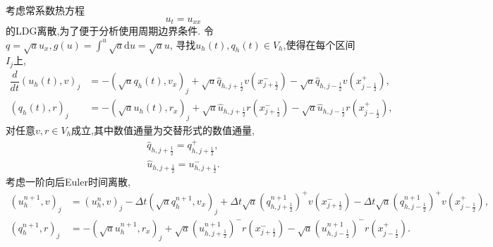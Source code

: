 \documentclass[a4paper, 11pt]{ctexart}
\numberwithin{equation}{section}
\numberwithin{figure}{section}
\newcommand\dd{\mathrm{d}}
\begin{document}
考虑常系数热方程
\begin{equation*}
  u_t=u_{xx}
\end{equation*}
的LDG离散,为了便于分析使用周期边界条件.
令$q=\sqrt{a}u_x,g(u)=\int^u \sqrt{a}\dd u=\sqrt{a}u$,
寻找$u_h(t),q_h(t)\in V_h$,使得在每个区间$I_j$上,
\begin{align}
  \dfrac{d}{dt}(u_h(t),v)_j&=-(\sqrt{a}q_h(t),v_x)_j
  +\sqrt{a}\hat{q}_{h,j+\frac12}v(x_{j+\frac12}^-)
  -\sqrt{a}\hat{q}_{h,j-\frac12}v(x_{j-\frac12}^+),
  \label{eq:ldg_space1} \\
  (q_h(t),r)_j&=-(\sqrt{a}u_h(t),r_x)_j
  +\sqrt{a}\hat{u}_{h,j+\frac12}r(x_{j+\frac12}^-)
  -\sqrt{a}\hat{u}_{h,j-\frac12}r(x_{j-\frac12}^+),
  \label{eq:ldg_space2}
\end{align}
对任意$v,r\in V_h$成立,其中数值通量为交替形式的数值通量,
\begin{align}
\hat {q}_{h,j+\frac12}=q_{h,j+\frac12}^{+},\\
\hat {u}_{h,j+\frac12}=u_{h,j+\frac12}^{-}.
\end{align}
考虑一阶向后Euler时间离散,
\begin{align}
  (u_h^{n+1},v)_j&=(u_h^{n},v)_j-\Delta t(\sqrt{a}q_h^{n+1},v_x)_j
  +\Delta t\sqrt{a}({q}^{n+1}_{h,j+\frac12})^{+}v(x_{j+\frac12}^-)
  -\Delta t\sqrt{a}({q}^{n+1}_{h,j-\frac12})^{+}v(x_{j-\frac12}^+),
  \label{eq:ldg_st1} \\
  (q_h^{n+1},r)_j&=-(\sqrt{a}u_h^{n+1},r_x)_j
  +\sqrt{a}({u}^{n+1}_{h,j+\frac12})^{-}r(x_{j+\frac12}^-)
  -\sqrt{a}({u}^{n+1}_{h,j-\frac12})^{-}r(x_{j-\frac12}^+).
  \label{eq:ldg_st2}
\end{align}
\end{document}
